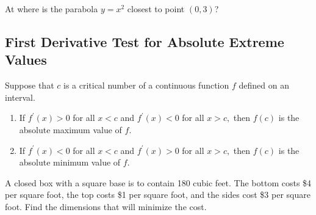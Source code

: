 
  
    
\begin{example}

At where is the parabola \(y=x^2\) closest to point \((0,3)\)?

\end{example}
\vspace*{6\baselineskip}


\hypertarget{first-derivative-test-for-absolute-extreme-values}{%
\subsection{First Derivative Test for Absolute Extreme
Values}\label{first-derivative-test-for-absolute-extreme-values}}

\begin{theorem}

Suppose that \(c\) is a critical number of a continuous function \(f\)
defined on an interval.

\begin{enumerate}[sepno]
\item
  If \(f^{\prime}(x)>0\) for all \(x<c\) and \(f^{\prime}(x)<0\) for all
  \(x>c,\) then \(f(c)\) is the absolute maximum value of \(f\).
\item
  If \(f^{\prime}(x)<0\) for all \(x<c\) and \(f^{\prime}(x)>0\) for all
  \(x>c,\) then \(f(c)\) is the absolute minimum value of \(f\).
\end{enumerate}

\end{theorem}

\begin{example}

A closed box with a square base is to contain 180 cubic feet. The bottom
costs \$4 per square foot, the top costs \$1 per square foot, and the
sides cost \$3 per square foot. Find the dimensions that will minimize
the cost.

\end{example}
\vspace*{6\baselineskip}

